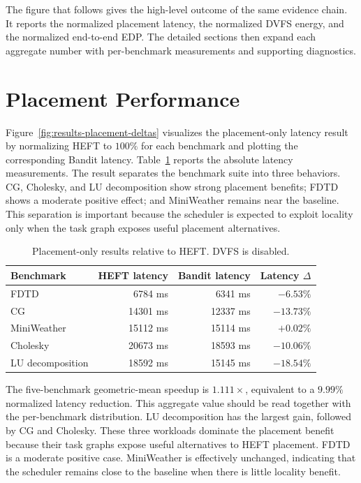 The figure that follows gives the high-level outcome of the same evidence
chain. It reports the normalized placement latency, the normalized DVFS energy,
and the normalized end-to-end EDP. The detailed sections then expand each
aggregate number with per-benchmark measurements and supporting diagnostics.

\figResultsOverview

\section{Placement Performance}
\label{sec:results-placement-performance}

Figure~\ref{fig:results-placement-deltas} visualizes the placement-only
latency result by normalizing HEFT to \(100\%\) for each benchmark and plotting
the corresponding Bandit latency. Table~\ref{tab:results-placement-main}
reports the absolute latency measurements. The result separates the benchmark
suite into three behaviors. CG, Cholesky, and LU decomposition show strong
placement benefits; FDTD shows a moderate positive effect; and MiniWeather
remains near the baseline. This separation is important because the scheduler
is expected to exploit locality only when the task graph exposes useful
placement alternatives.

\figPlacementDeltas

\begin{table}[!htbp]
\centering
\footnotesize
\begin{tabular}{@{}lrrr@{}}
\toprule
Benchmark & HEFT latency & Bandit latency & Latency \(\Delta\) \\
\midrule
FDTD & 6784 ms & 6341 ms & \(-6.53\%\) \\
CG & 14301 ms & 12337 ms & \(-13.73\%\) \\
MiniWeather & 15112 ms & 15114 ms & \(+0.02\%\) \\
Cholesky & 20673 ms & 18593 ms & \(-10.06\%\) \\
LU decomposition & 18592 ms & 15145 ms & \(-18.54\%\) \\
\bottomrule
\end{tabular}
\caption{Placement-only results relative to HEFT. DVFS is disabled.}
\label{tab:results-placement-main}
\end{table}

The five-benchmark geometric-mean speedup is \(1.111\times\), equivalent to
a \(9.99\%\) normalized latency reduction. This aggregate value should be read
together with the per-benchmark distribution. LU decomposition has the largest
gain, followed by CG and Cholesky. These three workloads dominate the
placement benefit because their task graphs expose useful alternatives to HEFT
placement. FDTD is a moderate positive case. MiniWeather is effectively
unchanged, indicating that the scheduler remains close to the baseline when
there is little locality benefit.

